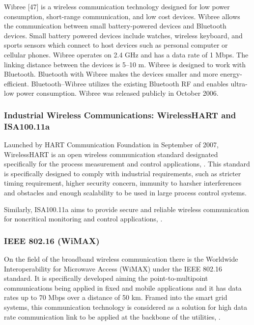 Wibree [47] is a wireless communication technology
designed for low power consumption, short-range
communication, and low cost devices. Wibree allows the
communication between small battery-powered devices
and Bluetooth devices. Small battery powered devices include
watches, wireless keyboard, and sports sensors
which connect to host devices such as personal computer
or cellular phones. Wibree operates on 2.4 GHz and has a
data rate of 1 Mbps. The linking distance between the devices
is 5–10 m. Wibree is designed to work with Bluetooth.
Bluetooth with Wibree makes the devices smaller
and more energy-efficient. Bluetooth–Wibree utilizes the existing Bluetooth RF and enables ultra-low power consumption.
Wibree was released publicly in October 2006.


\subsubsection{Industrial Wireless Communications: WirelessHART and ISA100.11a}

Launched by HART Communication Foundation in September of 2007, WirelessHART is an open wireless communication standard designated specifically for the process measurement and control applications, \cite{Song2008}. This standard is specifically designed to comply with industrial requirements, such as stricter timing requirement, higher security concern, immunity to harsher interferences and obstacles and enough scalability to be used in large process control systems.

Similarly, ISA100.11a aims to provide secure and reliable wireless communication for noncritical monitoring and control applications, \cite{Petersen2011}.





\subsubsection{IEEE 802.16 (WiMAX)}

On the field of the broadband wireless communication there is the Worldwide Interoperability for Microwave Access (WiMAX) under the IEEE 802.16 standard. It is specifically developed aiming the point-to-multipoint communications being applied in fixed and mobile applications and it has data rates up to 70 Mbps over a distance of 50 km. Framed into the smart grid systems, this communication technology is considered as a solution for high data rate communication link to be applied at the backbone of the utilities, \cite{Usman2013}.


